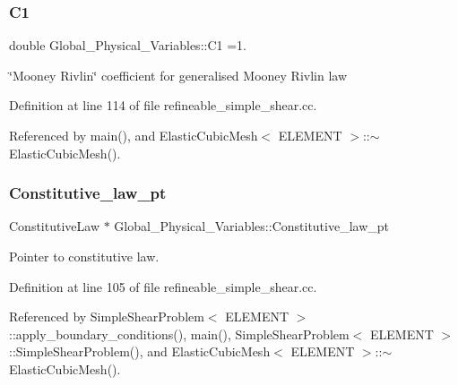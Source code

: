 \subsubsection{\texorpdfstring{C1}{C1}}
{\footnotesize\ttfamily double Global\+\_\+\+Physical\+\_\+\+Variables\+::\+C1 =1.}



\char`\"{}\+Mooney Rivlin\char`\"{} coefficient for generalised Mooney Rivlin law 



Definition at line 114 of file refineable\+\_\+simple\+\_\+shear.\+cc.



Referenced by main(), and Elastic\+Cubic\+Mesh$<$ E\+L\+E\+M\+E\+N\+T $>$\+::$\sim$\+Elastic\+Cubic\+Mesh().

\mbox{\label{namespaceGlobal__Physical__Variables_a5d5f19442938130d36ee7476ae25049c}} 
\subsubsection{\texorpdfstring{Constitutive\+\_\+law\+\_\+pt}{Constitutive\_law\_pt}}
{\footnotesize\ttfamily Constitutive\+Law $\ast$ Global\+\_\+\+Physical\+\_\+\+Variables\+::\+Constitutive\+\_\+law\+\_\+pt}



Pointer to constitutive law. 



Definition at line 105 of file refineable\+\_\+simple\+\_\+shear.\+cc.



Referenced by Simple\+Shear\+Problem$<$ E\+L\+E\+M\+E\+N\+T $>$\+::apply\+\_\+boundary\+\_\+conditions(), main(), Simple\+Shear\+Problem$<$ E\+L\+E\+M\+E\+N\+T $>$\+::\+Simple\+Shear\+Problem(), and Elastic\+Cubic\+Mesh$<$ E\+L\+E\+M\+E\+N\+T $>$\+::$\sim$\+Elastic\+Cubic\+Mesh().

\mbox{\label{namespaceGlobal__Physical__Variables_a09a019474b7405b35da2437f7779bc7e}} 
